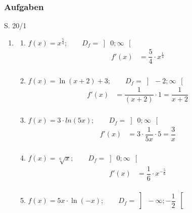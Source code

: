 
\subsubsection{Aufgaben}

\begin{Exercise}{S. 20/1}{}
    \begin{enumerate}
        \item [1.]\begin{enumerate}[label=\alph*)]
            \item[a)] {
                $f(x) = x^{\frac{5}{4}}; \qquad D_{f} = \left] \ 0; \infty \ \right[$\\[-2.0ex]
                \begin{align*}
                    f'(x) &= \dfrac{5}{4} \cdot x^{\frac{1}{4}} &&\\[-2.0ex]
                \end{align*}
                }
            \item [b)] {
                $f(x) = \ln(x + 2) + 3; \qquad D_{f} = \left] \ -2; \infty \ \right[$\\[-2.0ex]
                \begin{align*}
                    f'(x) &= \dfrac{1}{\left(x + 2\right)} \cdot 1 = \dfrac{1}{x + 2} &&\\[-2.0ex]
                \end{align*}
                }
            \item [c)] {
                $f(x) = 3 \cdot ln(5x); \qquad D_{f} = \left] \ 0; \infty \ \right[$\\[-2.0ex]
                \begin{align*}
                    f'(x) &= 3 \cdot \dfrac{1}{5x} \cdot 5 = \dfrac{3}{x} &&\\[-2.0ex]
                \end{align*}
                }
            \item [d)] {
                $f(x) = \sqrt[6]{x}; \qquad D_{f} = \left] \ 0; \infty \ \right[$\\[-2.0ex]
                \begin{align*}
                    f'(x) &= \dfrac{1}{6} \cdot x^{-\frac{5}{6}}&&\\[-2.0ex]
                \end{align*}
                }
            \item [e)] {
                $f(x) = 5x \cdot \ln(-x); \qquad D_{f} = \left] \ -\infty; -\dfrac{1}{2} \ \right[$\\[-2.0ex]
}
\end{enumerate}
\end{enumerate}
\end{Exercise}
